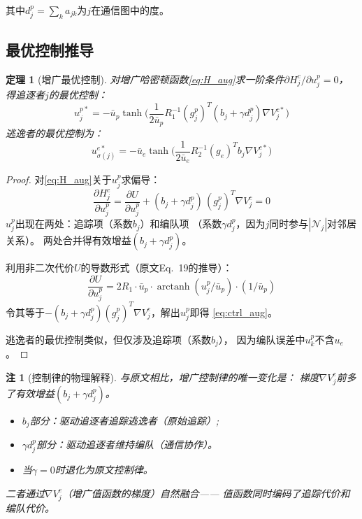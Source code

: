 \documentclass[11pt,a4paper]{article}
\newtheorem{theorem}{定理}
\newtheorem{remark}{注}
\DeclareMathOperator{\arctanh}{arctanh}
\newcommand{\ub}{\bar{u}}
\begin{document}
其中$d_j^p = \sum_k a_{jk}$为$j$在通信图中的度。

\subsection{最优控制推导}

\begin{theorem}[增广最优控制]\label{thm:opt_ctrl}
  对增广哈密顿函数\eqref{eq:H_aug}求一阶条件$\partial H_j^c / \partial u_j^p = 0$，
  得追逐者$j$的最优控制：
  \begin{equation}\label{eq:ctrl_aug}
    \boxed{
    u_j^{p*} = -\ub_p \tanh\!\Big(
      \frac{1}{2\ub_p} R_1^{-1} (g_j^p)^T
      (b_j + \gamma d_j^p) \nabla V_j^{c*}
    \Big)
    }
  \end{equation}
  逃逸者的最优控制为：
  \begin{equation}\label{eq:ctrl_evader}
    u_{\sigma(j)}^{e*} = -\ub_e \tanh\!\Big(
      \frac{1}{2\ub_e} R_2^{-1} (g_e)^T b_j \nabla V_j^{c*}
    \Big)
  \end{equation}
\end{theorem}

\begin{proof}
  对\eqref{eq:H_aug}关于$u_j^p$求偏导：
  \begin{equation}
    \frac{\partial H_j^c}{\partial u_j^p}
    = \frac{\partial U}{\partial u_j^p}
    + (b_j + \gamma d_j^p)\, (g_j^p)^T \nabla V_j^c
    = 0
  \end{equation}
  $u_j^p$出现在两处：追踪项（系数$b_j$）和编队项
  （系数$\gamma d_j^p$，因为$j$同时参与$|\mathcal{N}_j|$对邻居关系）。
  两处合并得有效增益$(b_j + \gamma d_j^p)$。

  利用非二次代价$U$的导数形式（原文Eq.~19的推导）：
  \begin{equation}
    \frac{\partial U}{\partial u_j^p} =
    2 R_1 \cdot \ub_p \cdot \arctanh(u_j^p / \ub_p) \cdot (1/\ub_p)
  \end{equation}
  令其等于$-(b_j + \gamma d_j^p)(g_j^p)^T \nabla V_j^c$，解出$u_j^p$即得
  \eqref{eq:ctrl_aug}。

  逃逸者的最优控制类似，但仅涉及追踪项（系数$b_j$），
  因为编队误差中$u_k^p$不含$u_e$。
\end{proof}

\begin{remark}[控制律的物理解释]
  与原文相比，增广控制律的唯一变化是：
  梯度$\nabla V_j^c$前多了有效增益$(b_j + \gamma d_j^p)$。
  \begin{itemize}
    \item $b_j$部分：驱动追逐者追踪逃逸者（原始追踪）;
    \item $\gamma d_j^p$部分：驱动追逐者维持编队（通信协作）。
    \item 当$\gamma = 0$时退化为原文控制律。
  \end{itemize}
  二者通过$\nabla V_j^c$（增广值函数的梯度）自然融合——
  值函数同时编码了追踪代价和编队代价。
\end{remark}
\end{document}
